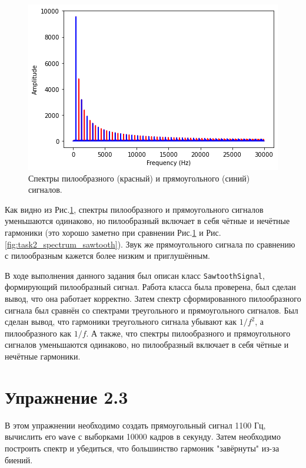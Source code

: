 \documentclass[a4paper, 14pt]{extarticle}
\begin{document}
    \begin{figure}[H]
        \centering
        \includegraphics[width=0.8\linewidth]{resources/Images/task2_spectrum_sawtooth_square}
        \caption{Спектры пилообразного (красный) и прямоугольного (синий) сигналов.}
        \label{fig:task2_spectrum_sawtooth_square}
    \end{figure}

    Как видно из Рис.\ref{fig:task2_spectrum_sawtooth_square}, спектры пилообразного и прямоугольного сигналов уменьшаются одинаково,
    но пилообразный включает в себя чётные и нечётные гармоники (это хорошо заметно при сравнении Рис.\ref{fig:task2_spectrum_sawtooth_square} и Рис.\ref{fig:task2_spectrum_sawtooth}).
    Звук же прямоугольного сигнала по сравнению с пилообразным кажется более низким и приглушённым.

    В ходе выполнения данного задания был описан класс \texttt{SawtoothSignal}, формирующий пилообразный сигнал.
    Работа класса была проверена, был сделан вывод, что она работает корректно.
    Затем спектр сформированного пилообразного сигнала был сравнён со спектрами треугольного и прямоугольного сигналов.
    Был сделан вывод, что гармоники треугольного сигнала убывают как $1/f^2$, а пилообразного как $1/f$.
    А также, что спектры пилообразного и прямоугольного сигналов уменьшаются одинаково, но пилообразный включает в себя чётные и нечётные гармоники.

    \newpage

    \section{Упражнение 2.3}
    \label{sec:task3}

    В этом упражнении необходимо создать прямоугольный сигнал 1100 Гц, вычислить его \texttt{wave} с выборками 10000 кадров в секунду.
    Затем необходимо построить спектр и убедиться, что большинство гармоник "завёрнуты" из-за биений.
\end{document}
